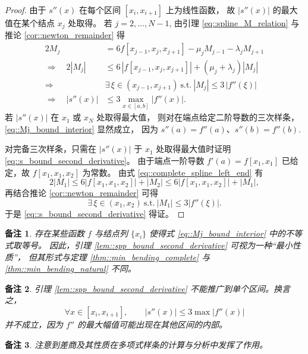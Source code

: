 \documentclass[a4paper]{ctexart}
\newtheorem{remark}{备注}
\numberwithin{theorem}{section}
\numberwithin{equation}{section}
\numberwithin{figure}{section}
\numberwithin{remark}{section}
\begin{document}
\begin{proof}
由于 $s''(x)$ 在每个区间 $[x_i,x_{i+1}]$ 上为线性函数，
故 $|s''(x)|$ 的最大值在某个结点 $x_j$ 处取得。
若 $j=2,\ldots,N-1$, 由引理 \ref{eq::spline_M_relation} 
与推论 \ref{cor::newton_remainder} 得
\begin{align}
    \label{eq::Mj_bound_interior}
2M_j &= 6 f[x_{j-1},x_j,x_{j+1}] - \mu_j M_{j-1} - \lambda_j M_{j+1} \nonumber\\
\Rightarrow\quad
2|M_j| &\le 6\,|f[x_{j-1},x_j,x_{j+1}]| + (\mu_j+\lambda_j)|M_j| \nonumber\\
\Rightarrow\quad
&\exists\,\xi\in(x_{j-1},x_{j+1})\ \text{s.t.}\ |M_j|\le 3\,|f''(\xi)| \nonumber\\
\Rightarrow\quad
|s''(x)| &\le 3\max_{x\in[a,b]}|f''(x)|.
\end{align}
若 $|s''(x)|$ 在 $x_1$ 或 $x_N$ 处取得最大值，
则对在端点给定二阶导数的三次样条，\eqref{eq::Mj_bound_interior} 显然成立，
因为 $s''(a)=f''(a)$、$s''(b)=f''(b)$.

对完备三次样条，只需在 $|s''(x)|$ 于 $x_1$ 
处取得最大值时证明 \eqref{eq::s_bound_second_derivative}。
由于端点一阶导数 $f'(a)=f[x_1,x_1]$ 已给定，故 $f[x_1,x_1,x_2]$ 为常数。
由式 \eqref{eq::complete_spline_left_end} 有
\[
2|M_1|\le 6|f[x_1,x_1,x_2]|+|M_2|\le 6|f[x_1,x_1,x_2]|+|M_1|,
\]
再结合推论 \ref{cor::newton_remainder} 可得
\[
\exists\,\xi\in(x_1,x_2)\ \text{s.t.}\ |M_1|\le 3|f''(\xi)|.
\]
于是 \eqref{eq::s_bound_second_derivative} 得证。
\end{proof}

\begin{remark}
    \label{rem::tight_constant_3}
存在某些函数 $f$ 与结点列 $\{x_i\}$ 
使得式 \eqref{eq::Mj_bound_interior} 中的不等式取等号。
因此，引理 \ref{lem::spp_bound_second_derivative} 可视为一种“最小性质”，
但其形式与定理 \ref{thm::min_bending_complete} 
与 \ref{thm::min_bending_natural} 不同。
\end{remark}

\begin{remark}
    \label{rem::cannot_localize_interval}
引理 \ref{lem::spp_bound_second_derivative} 不能推广到单个区间。换言之，
\[
\forall x\in[x_i,x_{i+1}],\qquad |s''(x)|\le 3\max|f''(x)|
\]
并不成立，因为 $f''$ 的最大幅值可能出现在其他区间的内部。
\end{remark}

\begin{remark}
    \label{rem::divided_diff_helpful}
注意到差商及其性质在多项式样条的计算与分析中发挥了作用。
\end{remark}
\end{document}
